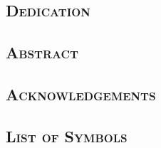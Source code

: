 \documentclass[a4paper,11pt,oneside,leqno,fleqn]{book} %
\theoremstyle{mythm}
\newcommand\blankpage{%
\null
\thispagestyle{empty}%
\newpage}
\def\biblio{}
\numberwithin{equation}{thm}
\begin{document}
\pagestyle{plain}

\def\biblio{}
\frontmatter

\clearpage
\setcounter{page}{1}

\doublespacing

\begin{center}\section*{\textsc{Dedication}}\end{center}

\cleartooddpage
{}
\begin{center}\section*{\textsc{Abstract}}\end{center}


\cleartooddpage
{}
\begin{center}\section*{\textsc{Acknowledgements}}\end{center}
\newpage
\blankpage

\singlespace

\cleartooddpage
\tableofcontents{}
\clearpage

\cleartooddpage
{}
\begin{center}\section*{\textsc{List of Symbols}}\end{center}
\clearpage
\end{document}
